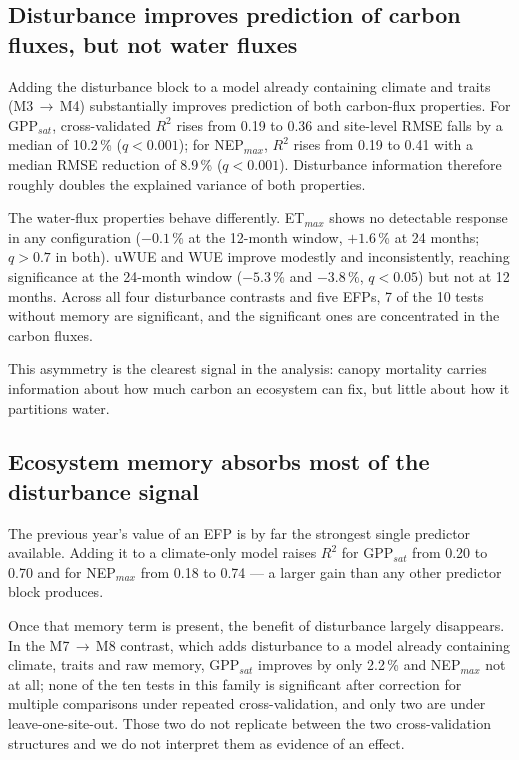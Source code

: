 \documentclass[pdflatex,sn-nature]{sn-jnl}%
\theoremstyle{thmstyleone}%
\theoremstyle{thmstyletwo}%
\theoremstyle{thmstylethree}%
\begin{document}
\subsection{Disturbance improves prediction of carbon fluxes, but not water fluxes}

Adding the disturbance block to a model already containing climate and traits (M3\,$\rightarrow$\,M4) substantially improves prediction of both carbon-flux properties. For GPP$_{sat}$, cross-validated $R^2$ rises from 0.19 to 0.36 and site-level RMSE falls by a median of 10.2\,\% ($q<0.001$); for NEP$_{max}$, $R^2$ rises from 0.19 to 0.41 with a median RMSE reduction of 8.9\,\% ($q<0.001$). Disturbance information therefore roughly doubles the explained variance of both properties.

The water-flux properties behave differently. ET$_{max}$ shows no detectable response in any configuration ($-0.1$\,\% at the 12-month window, $+1.6$\,\% at 24 months; $q>0.7$ in both). uWUE and WUE improve modestly and inconsistently, reaching significance at the 24-month window ($-5.3$\,\% and $-3.8$\,\%, $q<0.05$) but not at 12 months. Across all four disturbance contrasts and five EFPs, 7 of the 10 tests without memory are significant, and the significant ones are concentrated in the carbon fluxes.

This asymmetry is the clearest signal in the analysis: canopy mortality carries information about how much carbon an ecosystem can fix, but little about how it partitions water.



\subsection{Ecosystem memory absorbs most of the disturbance signal}

The previous year's value of an EFP is by far the strongest single predictor available. Adding it to a climate-only model raises $R^2$ for GPP$_{sat}$ from 0.20 to 0.70 and for NEP$_{max}$ from 0.18 to 0.74 --- a larger gain than any other predictor block produces.

Once that memory term is present, the benefit of disturbance largely disappears. In the M7\,$\rightarrow$\,M8 contrast, which adds disturbance to a model already containing climate, traits and raw memory, GPP$_{sat}$ improves by only 2.2\,\% and NEP$_{max}$ not at all; none of the ten tests in this family is significant after correction for multiple comparisons under repeated cross-validation, and only two are under leave-one-site-out. Those two do not replicate between the two cross-validation structures and we do not interpret them as evidence of an effect.
\end{document}

